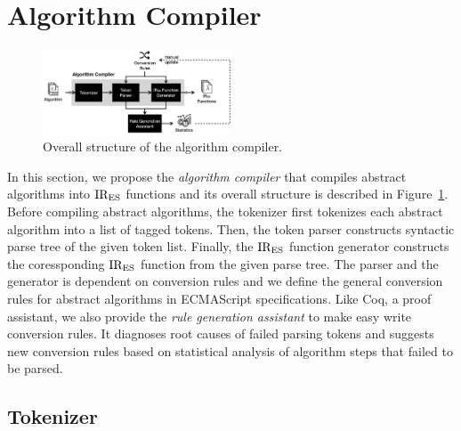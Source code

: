 \section{Algorithm Compiler}

\begin{figure}
  \centering
  \includegraphics[width=0.5\textwidth]{img/algo_compiler.png}
  \caption{Overall structure of the algorithm compiler.}
  \label{fig:algo-compiler}
\end{figure}

In this section, we propose the \textit{algorithm compiler}
that compiles abstract algorithms into \( \text{IR}_\text{ES} \) functions
and its overall structure is described in Figure~\ref{fig:algo-compiler}.
Before compiling abstract algorithms,
the tokenizer first tokenizes each abstract algorithm into
a list of tagged tokens. Then, the token parser constructs
syntactic parse tree of the given token list.
Finally, the \( \text{IR}_\text{ES} \) function generator constructs the coressponding
\( \text{IR}_\text{ES} \) function from the given parse tree.
The parser and the generator is dependent on conversion rules
and we define the general conversion rules for abstract algorithms in
ECMAScript specifications. Like Coq, a proof assistant, we also provide
the \textit{rule generation assistant} to make easy write conversion rules.
It diagnoses root causes of failed parsing tokens
and suggests new conversion rules based on
statistical analysis of algorithm steps that failed to be parsed.

\subsection{Tokenizer}


